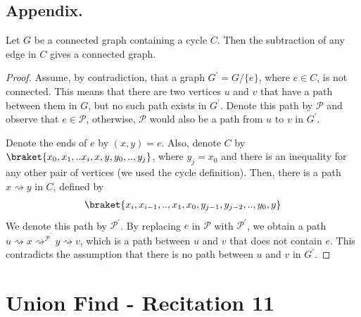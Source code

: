 \section{Appendix.}

\begin{claim}
  \label{claim:subtract}
  Let $G$ be a connected graph containing a cycle $C$. Then the subtraction of any edge in $C$ gives a connected graph. 
\end{claim}
\begin{proof}
Assume, by contradiction, that a graph $G^{\prime} = G / \{ e \} $, where $e \in C$, is not connected. This means that there are two vertices $u$ and $v$ that have a path between them in $G$, but no such path exists in $G^{\prime}$. Denote this path by $\mathcal{P}$ and observe that $e \in \mathcal{P}$, otherwise, $\mathcal{P}$ would also be a path from $u$ to $v$ in $G^{\prime}$.

Denote the ends of $e$ by $(x,y)=e$. Also, denote $C$ by $\braket{x_{0},x_{1},..x_{i},x,y,y_{0},..,y_{j}}$, where $y_{j}=x_{0}$ and there is an inequality for any other pair of vertices (we used the cycle definition). Then, there is a path $x \rightsquigarrow y$ in $C$, defined by 
\begin{equation*}
  \begin{split}
\braket{x_{i},x_{i-1},..,x_{1},x_{0},y_{j-1},y_{j-2},..,y_{0},y}
  \end{split}
\end{equation*}
 We denote this path by $\mathcal{P}^{\prime}$. By replacing $e$ in $\mathcal{P}$ with $\mathcal{P}^{\prime}$, we obtain a path $u \rightsquigarrow x \rightsquigarrow^{\mathcal{P}^\prime} y \rightsquigarrow v$, which is a path between $u$ and $v$ that does not contain $e$. This contradicts the assumption that there is no path between $u$ and $v$ in $G^{\prime}$.
\end{proof}






\chapter{Union Find - Recitation 11} 

\usetikzlibrary{positioning, arrows}

\iffalse
  \newtheorem{prop}{Proposition}
  \newtheorem{ex}{Exercise}
  \newtheorem{sol}{Solution}
  \newtheorem{theorem}{Theorem} \newtheorem{thm}{Theorem}[section]
  \newtheorem{conj}[thm]{Conjecture} \newtheorem{lemma}[thm]{Lemma}
  \newtheorem{corollary}[thm]{Corollary} \newtheorem{claim}[thm]{Claim}
  \newtheorem{proposition}[thm]{Proposition}
  \newtheorem{definition}{Definition} \newtheorem{remark}{Remark}

